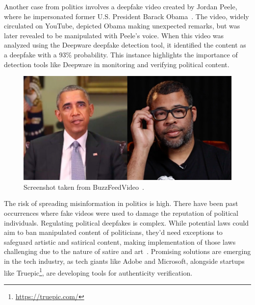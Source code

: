 Another case from politics involves a deepfake video created by Jordan Peele, where he
impersonated former U.S. President Barack Obama~\cite{peele,10.1145/3371409}. The video, widely
circulated on YouTube, depicted Obama making unexpected remarks, but was later revealed to be
manipulated with Peele's voice. When this video was analyzed using the Deepware deepfake
detection tool, it identified the content as a deepfake with a 93\% probability. This instance
highlights the importance of detection tools like Deepware in monitoring and verifying
political content.

\begin{figure}[ht]
	\centering
	\includegraphics[width=0.8\columnwidth]{figures/obama}
	\caption{Screenshot taken from BuzzFeedVideo~\cite{peele}.}\label{obama-youtube}
\end{figure}

The risk of spreading misinformation in politics is high. There have been past
occurrences where fake videos were used to damage the reputation of political individuals.
Regulating political deepfakes is complex. While potential laws could aim to ban manipulated
content of politicians, they'd need exceptions to safeguard artistic and satirical content,
making implementation of those laws challenging due to the nature of satire and art~\cite{politics,vanity-fair}.
Promising solutions are emerging in the tech industry, as tech giants like Adobe and Microsoft,
alongside startups like Truepic\footnote{\url{https://truepic.com/}}, are developing tools for
authenticity verification.